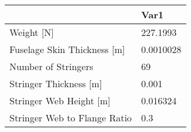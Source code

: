 \begin{tabular}{ll}
& Var1 \\ 
\hline 
Weight [N] & 227.1993 \\ 
Fuselage Skin Thickness [m] & 0.0010028 \\ 
Number of Stringers & 69 \\ 
Stringer Thickness [m] & 0.001 \\ 
Stringer Web Height [m] & 0.016324 \\ 
Stringer Web to Flange Ratio & 0.3 \\ 
\hline 
\end{tabular}